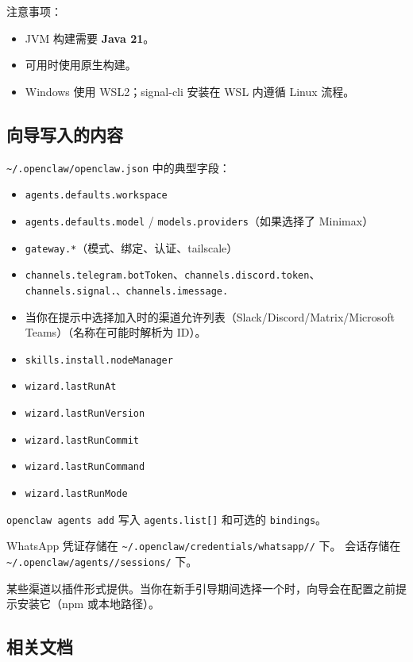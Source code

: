 注意事项：

\begin{itemize}
  \item JVM 构建需要 \textbf{Java 21}。
  \item 可用时使用原生构建。
  \item Windows 使用 WSL2；signal-cli 安装在 WSL 内遵循 Linux 流程。
\end{itemize}


\subsection{向导写入的内容}


\texttt{\textasciitilde{}/.openclaw/openclaw.json} 中的典型字段：

\begin{itemize}
  \item \texttt{agents.defaults.workspace}
  \item \texttt{agents.defaults.model} / \texttt{models.providers}（如果选择了 Minimax）
  \item \texttt{gateway.*}（模式、绑定、认证、tailscale）
  \item \texttt{channels.telegram.botToken}、\texttt{channels.discord.token}、\texttt{channels.signal.\textit{}、\texttt{channels.imessage.}}
  \item 当你在提示中选择加入时的渠道允许列表（Slack/Discord/Matrix/Microsoft Teams）（名称在可能时解析为 ID）。
  \item \texttt{skills.install.nodeManager}
  \item \texttt{wizard.lastRunAt}
  \item \texttt{wizard.lastRunVersion}
  \item \texttt{wizard.lastRunCommit}
  \item \texttt{wizard.lastRunCommand}
  \item \texttt{wizard.lastRunMode}
\end{itemize}


\texttt{openclaw agents add} 写入 \texttt{agents.list[]} 和可选的 \texttt{bindings}。

WhatsApp 凭证存储在 \texttt{\textasciitilde{}/.openclaw/credentials/whatsapp//} 下。
会话存储在 \texttt{\textasciitilde{}/.openclaw/agents//sessions/} 下。

某些渠道以插件形式提供。当你在新手引导期间选择一个时，向导会在配置之前提示安装它（npm 或本地路径）。

\subsection{相关文档}



